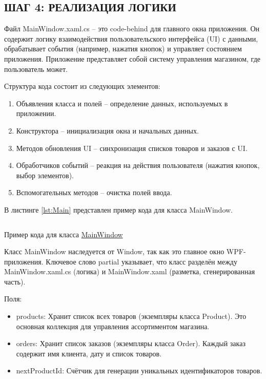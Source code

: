 \documentclass[12pt]{article}
\newcommand{\colorGIT}[1]{\textcolor{CtpLavender}{#1}}
\renewcommand{\texttt}[1]{{\small\ttfamily #1}}
\newenvironment{code}{\captionsetup{type=listing}}{}
\numberwithin{listing}{section}
\numberwithin{figure}{section}
\begin{document}
\newpage

\subsection{ШАГ 4: РЕАЛИЗАЦИЯ ЛОГИКИ}

Файл \texttt{MainWindow.xaml.cs} -- это \texttt{code-behind} для главного окна приложения. Он содержит логику взаимодействия пользовательского интерфейса (\texttt{UI}) с данными, обрабатывает события (например, нажатия кнопок) и управляет состоянием приложения. Приложение представляет собой систему управления магазином, где пользователь может.

Структура кода состоит из следующих элементов:
\begin{enumerate}
	\item Объявления класса и полей -- определение данных, используемых в приложении.
	\item Конструктора -- инициализация окна и начальных данных.
	\item Методов обновления \texttt{UI} -- синхронизация списков товаров и заказов с \texttt{UI}.
	\item Обработчиков событий -- реакция на действия пользователя (нажатия кнопок, выбор элементов).
	\item Вспомогательных методов -- очистка полей ввода.
\end{enumerate}
В листинге \ref{lst:Main} представлен пример кода для класса \texttt{MainWindow}.

\begin{code}
	\inputminted[firstline=1, lastline=21]{csharp}{../../3lab/StoreManager/MainWindow.xaml.cs}
	\caption{Пример кода для класса \colorGIT{\href{https://github.com/WebMasterIT/Csharp_Labs/blob/ec375afd16c0647b337cf3d8a79c8bef904fc1be/3lab/StoreManager/MainWindow.xaml.cs\#L1-L21}{MainWindow}}}
	\label{lst:Main}
\end{code}

Класс \texttt{MainWindow} наследуется от \texttt{Window}, так как это главное окно \texttt{WPF}-приложения. Ключевое слово \texttt{partial} указывает, что класс разделён между \texttt{MainWindow.xaml.cs} (логика) и \texttt{MainWindow\-.xaml} (разметка, сгенерированная часть).

\noindent Поля:
\begin{itemize}
	\item \texttt{products}: Хранит список всех товаров (экземпляры класса \texttt{Product}). Это основная коллекция для управления ассортиментом магазина.
	\item \texttt{orders}: Хранит список заказов (экземпляры класса \texttt{Order}). Каждый заказ содержит имя клиента, дату и список товаров.
	\item \texttt{nextProductId}: Счётчик для генерации уникальных идентификаторов товаров.
\end{itemize}
\end{document}
